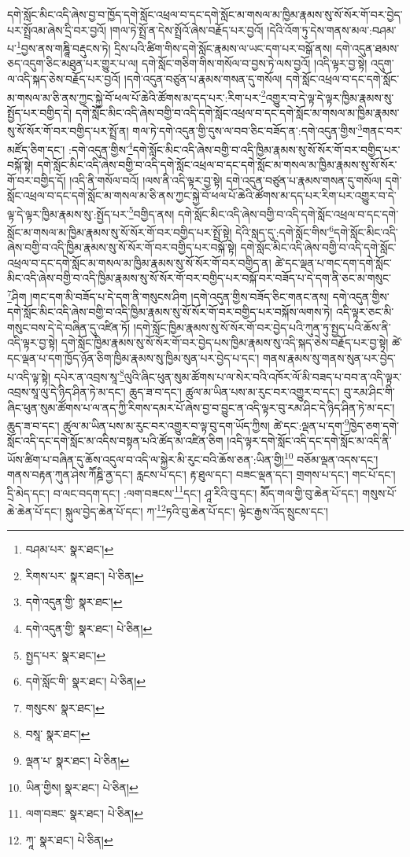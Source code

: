 དགེ་སློང་མིང་འདི་ཞེས་བྱ་བ་ཁྱོད་དགེ་སློང་འཕྲལ་བ་དང་དགེ་སློང་མ་གསལ་མ་ཁྱིམ་རྣམས་སུ་སོ་སོར་གོ་བར་བྱེད་པར་སྤྲོའམ་ཞེས་དྲི་བར་བྱའོ། །གལ་ཏེ་སྤྲོ་ན་དེས་སྤྲོའོ་ཞེས་བརྗོད་པར་བྱའོ། །དེའི་འོག་ཏུ་དེས་གནས་མལ་:བཤམ་པ་\footnote{བཤམ་པར་  སྣར་ཐང་། }བྱས་ནས་གཎྜཱི་བརྡུངས་ཏེ། དྲིས་པའི་ཚིག་གིས་དགེ་སློང་རྣམས་ལ་ཡང་དག་པར་བསྒོ་ནས། དགེ་འདུན་ཐམས་ཅད་འདུག་ཅིང་མཐུན་པར་གྱུར་པ་ལ། དགེ་སློང་གཅིག་གིས་གསོལ་བ་བྱས་ཏེ་ལས་བྱའོ། །འདི་ལྟར་བྱ་སྟེ། འདུག་ལ་འདི་སྐད་ཅེས་བརྗོད་པར་བྱའོ། །དགེ་འདུན་བཙུན་པ་རྣམས་གསན་དུ་གསོལ། དགེ་སློང་འཕྲལ་བ་དང་དགེ་སློང་མ་གསལ་མ་ཅི་ནས་ཀྱང་སྐྱེ་བོ་ཕལ་པོ་ཆེའི་ཚོགས་མ་དད་པར་:རིག་པར་\footnote{རིགས་པར་  སྣར་ཐང་།  པེ་ཅིན། }འགྱུར་བ་དེ་ལྟ་དེ་ལྟར་ཁྱིམ་རྣམས་སུ་སྤྱོད་པར་བགྱིད་དེ། དགེ་སློང་མིང་འདི་ཞེས་བགྱི་བ་འདི་དགེ་སློང་འཕྲལ་བ་དང་དགེ་སློང་མ་གསལ་མ་ཁྱིམ་རྣམས་སུ་སོ་སོར་གོ་བར་བགྱིད་པར་སྤྲོ་ན། གལ་ཏེ་དགེ་འདུན་གྱི་དུས་ལ་བབ་ཅིང་བཟོད་ན་:དགེ་འདུན་གྱིས་\footnote{དགེ་འདུན་གྱི་  སྣར་ཐང་། }གནང་བར་མཛོད་ཅིག་དང་། :དགེ་འདུན་གྱིས་\footnote{དགེ་འདུན་གྱི་  སྣར་ཐང་།  པེ་ཅིན། }དགེ་སློང་མིང་འདི་ཞེས་བགྱི་བ་འདི་ཁྱིམ་རྣམས་སུ་སོ་སོར་གོ་བར་བགྱིད་པར་བསྐོ་སྟེ། དགེ་སློང་མིང་འདི་ཞེས་བགྱི་བ་འདི་དགེ་སློང་འཕྲལ་བ་དང་དགེ་སློང་མ་གསལ་མ་ཁྱིམ་རྣམས་སུ་སོ་སོར་གོ་བར་བགྱིད་དོ། །འདི་ནི་གསོལ་བའོ། །ལས་ནི་འདི་ལྟར་བྱ་སྟེ། དགེ་འདུན་བཙུན་པ་རྣམས་གསན་དུ་གསོལ། དགེ་སློང་འཕྲལ་བ་དང་དགེ་སློང་མ་གསལ་མ་ཅི་ནས་ཀྱང་སྐྱེ་བོ་ཕལ་པོ་ཆེའི་ཚོགས་མ་དད་པར་རིག་པར་འགྱུར་བ་དེ་ལྟ་དེ་ལྟར་ཁྱིམ་རྣམས་སུ་:སྤྱོད་པར་\footnote{སྤྱད་པར་  སྣར་ཐང་། }བགྱིད་ནས། དགེ་སློང་མིང་འདི་ཞེས་བགྱི་བ་འདི་དགེ་སློང་འཕྲལ་བ་དང་དགེ་སློང་མ་གསལ་མ་ཁྱིམ་རྣམས་སུ་སོ་སོར་གོ་བར་བགྱིད་པར་སྤྲོ་སྟེ། དེའི་སླད་དུ་:དགེ་སློང་གིས་\footnote{དགེ་སློང་གི་  སྣར་ཐང་།  པེ་ཅིན། }དགེ་སློང་མིང་འདི་ཞེས་བགྱི་བ་འདི་ཁྱིམ་རྣམས་སུ་སོ་སོར་གོ་བར་བགྱིད་པར་བསྐོ་སྟེ། དགེ་སློང་མིང་འདི་ཞེས་བགྱི་བ་འདི་དགེ་སློང་འཕྲལ་བ་དང་དགེ་སློང་མ་གསལ་མ་ཁྱིམ་རྣམས་སུ་སོ་སོར་གོ་བར་བགྱིད་ན། ཚེ་དང་ལྡན་པ་གང་དག་དགེ་སློང་མིང་འདི་ཞེས་བགྱི་བ་འདི་ཁྱིམ་རྣམས་སུ་སོ་སོར་གོ་བར་བགྱིད་པར་བསྐོ་བར་བཟོད་པ་དེ་དག་ནི་ཅང་མ་གསུང་\footnote{གསུངས་  སྣར་ཐང་། }ཤིག །གང་དག་མི་བཟོད་པ་དེ་དག་ནི་གསུངས་ཤིག །དགེ་འདུན་གྱིས་བཟོད་ཅིང་གནང་ནས། དགེ་འདུན་གྱིས་དགེ་སློང་མིང་འདི་ཞེས་བགྱི་བ་འདི་ཁྱིམ་རྣམས་སུ་སོ་སོར་གོ་བར་བགྱིད་པར་བསྐོས་ལགས་ཏེ། འདི་ལྟར་ཅང་མི་གསུང་བས་དེ་དེ་བཞིན་དུ་འཛིན་ཏོ། །དགེ་སློང་ཁྱིམ་རྣམས་སུ་སོ་སོར་གོ་བར་བྱེད་པའི་ཀུན་ཏུ་སྤྱད་པའི་ཆོས་ནི་འདི་ལྟར་བྱ་སྟེ། དགེ་སློང་ཁྱིམ་རྣམས་སུ་སོ་སོར་གོ་བར་བྱེད་པས་ཁྱིམ་རྣམས་སུ་འདི་སྐད་ཅེས་བརྗོད་པར་བྱ་སྟེ། ཚེ་དང་ལྡན་པ་དག་ཁྱོད་ཉོན་ཅིག་ཁྱིམ་རྣམས་སུ་ཁྱིམ་སུན་པར་བྱེད་པ་དང་། གནས་རྣམས་སུ་གནས་སུན་པར་བྱེད་པ་འདི་ལྟ་སྟེ། དཔེར་ན་འབྲས་སཱ་\footnote{བསཱ་  སྣར་ཐང་། }ལུའི་ཞིང་ཕུན་སུམ་ཚོགས་པ་ལ་སེར་བའི་འཁོར་ལོ་མི་བཟད་པ་བབ་ན་འདི་ལྟར་འབྲས་སཱ་ལུ་དེ་ཉིད་ཤིན་ཏེ་མ་དང་། ཆུད་ཟ་བ་དང་། ཚུལ་མ་ཡིན་པས་མ་རུང་བར་འགྱུར་བ་དང་། བུ་རམ་ཤིང་གི་ཞིང་ཕུན་སུམ་ཚོགས་པ་ལ་ནད་ཀྱི་རིགས་དམར་པོ་ཞེས་བྱ་བ་བྱུང་ན་འདི་ལྟར་བུ་རམ་ཤིང་དེ་ཉིད་ཤིན་ཏེ་མ་དང་། ཆུད་ཟ་བ་དང་། ཚུལ་མ་ཡིན་པས་མ་རུང་བར་འགྱུར་བ་ལྟ་བུ་དག་ཡོད་ཀྱིས། ཚེ་དང་:ལྡན་པ་དག་\footnote{ལྡན་པ་  སྣར་ཐང་།  པེ་ཅིན། }ཁྱེད་ཅག་དགེ་སློང་འདི་དང་དགེ་སློང་མ་འདིས་བསྟན་པའི་ཚོད་མ་འཛིན་ཅིག །འདི་ལྟར་དགེ་སློང་འདི་དང་དགེ་སློང་མ་འདི་ནི་ཡོས་ཚིག་པ་བཞིན་དུ་ཆོས་འདུལ་བ་འདི་ལ་སྐྱེར་མི་རུང་བའི་ཆོས་ཅན་:ཡིན་གྱི།\footnote{ཡིན་གྱིས།  སྣར་ཐང་།  པེ་ཅིན། } བཅོམ་ལྡན་འདས་དང་། གནས་བརྟན་ཀུན་ཤེས་ཀཽཎྜི་ནྱ་དང་། རླངས་པ་དང་། རྟ་ཐུལ་དང་། བཟང་ལྡན་དང་། གྲགས་པ་དང་། གང་པོ་དང་། དྲི་མེད་དང་། བ་ལང་བདག་དང་། :ལག་བཟངས་\footnote{ལག་བཟང་  སྣར་ཐང་།  པེ་ཅིན། }དང་། ཤཱ་རིའི་བུ་དང་། མཽད་གལ་གྱི་བུ་ཆེན་པོ་དང་། གསུས་པོ་ཆེ་ཆེན་པོ་དང་། སྐུལ་བྱེད་ཆེན་པོ་དང་། ཀ་\footnote{ཀཱ་  སྣར་ཐང་།  པེ་ཅིན། }ཏའི་བུ་ཆེན་པོ་དང་། ལྟེང་རྒྱས་འོད་སྲུངས་དང་། 